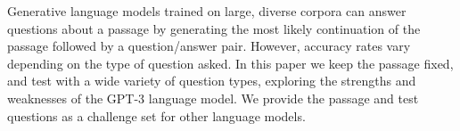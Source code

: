 Generative language models trained on large, diverse corpora can answer questions about a passage by generating the most likely continuation of the passage followed by a question/answer pair. However, accuracy rates vary depending on the type of question asked. In this paper we keep the passage fixed, and test with a wide variety of question types, exploring the strengths and weaknesses of the GPT-3 language model. We provide the passage and test questions as a challenge set for other language models.
